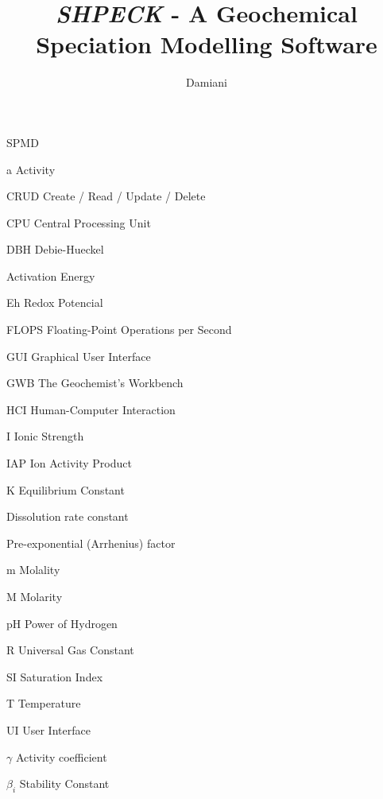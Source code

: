 \documentclass[ppgc,mestrado,english]{iiufrgs}
\title{\emph{SHPECK} - A Geochemical Speciation Modelling Software}
\author{Damiani}{Leonardo Hax}
\begin{document}
	
\renewcommand{\lstlistingname}{Code}

\maketitle

\clearpage
\begin{flushright}
\mbox{}\vfill
\end{flushright}

\renewcommand*\contentsname{Summary}
\tableofcontents



\begin{listofabbrv}{SPMD}
\item[a] Activity
\item[CRUD] Create / Read / Update / Delete
\item[CPU] Central Processing Unit
\item[DBH] Debie-Hueckel 
\item[\ce{E_a}] Activation Energy
\item[Eh] Redox Potencial
\item[FLOPS] Floating-Point Operations per Second
\item[GUI] Graphical User Interface
\item[GWB] The Geochemist's Workbench
\item[HCI] Human-Computer Interaction        
\item[I] Ionic Strength
\item[IAP] Ion Activity Product 
\item[K] Equilibrium Constant        
\item[\ce{k_{diss}}] Dissolution rate constant
\item[\ce{k_0}] Pre-exponential (Arrhenius) factor
\item[m] Molality
\item[M] Molarity
\item[pH] Power of Hydrogen
\item[R] Universal Gas Constant
\item[SI] Saturation Index 
\item[T] Temperature
\item[UI] User Interface
\item[$\gamma$] Activity coefficient
\item[$\beta_i$] Stability Constant         
\end{listofabbrv}
\end{document}
